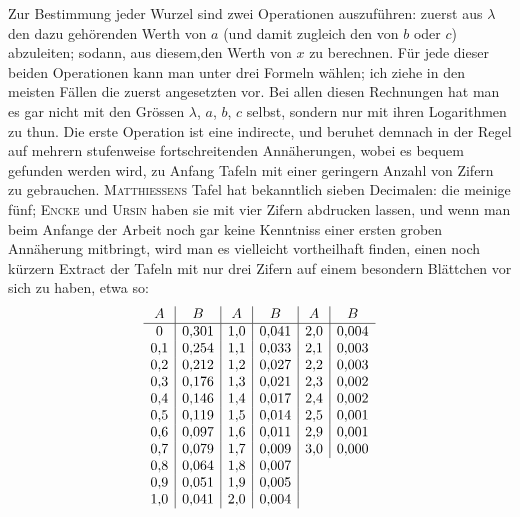 Zur Bestimmung jeder Wurzel sind zwei Operationen auszuführen: zuerst
aus $\lambda$ den dazu gehörenden Werth von $a$ (und damit zugleich den von $b$ oder $c$)
abzuleiten; sodann, aus diesem,den Werth von $x$ zu berechnen. Für jede dieser beiden Operationen kann man unter drei Formeln wählen; ich ziehe in den
meisten Fällen die zuerst angesetzten vor. Bei allen diesen Rechnungen hat man
es gar nicht mit den Grössen $\lambda$, $a$, $b$, $c$ selbst, sondern nur mit ihren Logarithmen zu thun. Die erste Operation ist eine indirecte, und beruhet demnach in der
Regel auf mehrern stufenweise fortschreitenden Annäherungen, wobei es bequem
gefunden werden wird, zu Anfang Tafeln mit einer geringern Anzahl von Zifern
zu gebrauchen. \textsc{Matthiessens} Tafel hat bekanntlich sieben Decimalen: die meinige fünf; \textsc{Encke} und \textsc{Ursin} haben sie mit vier Zifern abdrucken lassen, und wenn
man beim Anfange der Arbeit noch gar keine Kenntniss einer ersten groben Annäherung mitbringt, wird man es vielleicht vortheilhaft finden, einen noch kürzern Extract der Tafeln mit nur drei Zifern auf einem besondern Blättchen vor
sich zu haben, etwa so:
\[
\begin{array}[t]{c|c|}
A&B\\\hline
0&0{,}301\\
0{,}1&0{,}254\\
0{,}2&0{,}212\\
0{,}3&0{,}176\\
0{,}4&0{,}146\\
0{,}5&0{,}119\\
0{,}6&0{,}097\\
0{,}7&0{,}079\\
0{,}8&0{,}064\\
0{,}9&0{,}051\\
1{,}0&0{,}041
\end{array}
\begin{array}[t]{c|c|}
A&B\\\hline
1{,}0&0{,}041\\
1{,}1&0{,}033\\
1{,}2&0{,}027\\
1{,}3&0{,}021\\
1{,}4&0{,}017\\
1{,}5&0{,}014\\
1{,}6&0{,}011\\
1{,}7&0{,}009\\
1{,}8&0{,}007\\
1{,}9&0{,}005\\
2{,}0&0{,}004
\end{array}
\begin{array}[t]{c|c}
A&B\\\hline
2{,}0&0{,}004\\
2{,}1&0{,}003\\
2{,}2&0{,}003\\
2{,}3&0{,}002\\
2{,}4&0{,}002\\
2{,}5&0{,}001\\
2{,}9&0{,}001\\
3{,}0&0{,}000
\end{array}
\]
